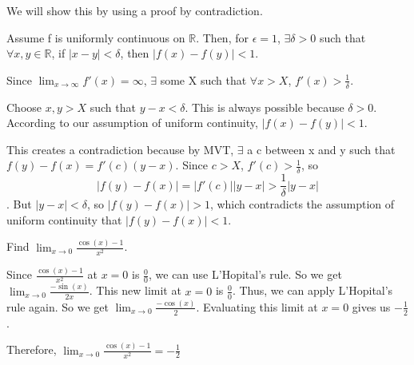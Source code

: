 \documentclass[answers]{exam}
\theoremstyle{remark}
\theoremstyle{definition}
\newcommand{\RR}{\mathbb{R}}
\begin{document}
\begin{questions}
\begin{solution}
We will show this by using a proof by contradiction.

Assume f is uniformly continuous on $\RR$. Then, for $\epsilon = 1$,
$\exists \delta > 0$ such that $\forall x, y \in \RR$, if $|x-y| < \delta$,
then $|f(x) - f(y)| < 1$.

Since $\lim_{x \to \infty} f'(x) = \infty$, $\exists$ some X
such that $\forall x > X$, $f'(x) > \frac{1}{\delta}$.

Choose $x, y > X$ such that $y-x < \delta$. This is always possible because
$\delta > 0$. According to our assumption of uniform continuity, $|f(x) - f(y)| < 1$.

This creates a contradiction because by MVT, $\exists$ a c between x and y
such that $f(y) - f(x) = f'(c)(y - x)$.
Since $c > X$, $f'(c) > \frac{1}{\delta}$, so
\[|f(y)-f(x)| = |f'(c)||y-x| > \frac{1}{\delta}|y-x|\].
But $|y-x| < \delta$, so $|f(y) - f(x)| > 1$, which contradicts the assumption
of uniform continuity that $|f(y) - f(x)| < 1$.

\end{solution}

\question[4]
Find $\lim_{x \to 0} \frac{\cos(x)-1}{x^2}$.
\begin{solution}

Since $\frac{\cos(x)-1}{x^2}$ at $x = 0$
is $\frac{0}{0}$, we can use L'Hopital's rule.
So we get $\lim_{x \to 0} \frac{-\sin(x)}{2x}$.
This new limit at $x = 0$ is $\frac{0}{0}$.
Thus, we can apply L'Hopital's rule again.
So we get $\lim_{x \to 0} \frac{-\cos(x)}{2}$.
Evaluating this limit at $x = 0$ gives us
$-\frac{1}{2}$.

Therefore, $\lim_{x \to 0} \frac{\cos(x)-1}{x^2} = -\frac{1}{2}$

\end{solution}

\question {}
\end{questions}
\end{document}
